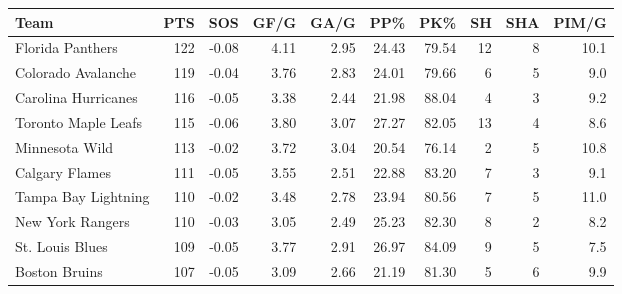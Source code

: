 \documentclass[
  11pt,
]{book}
\newenvironment{Shaded}{\begin{snugshade}}{\end{snugshade}}
\newcommand{\AttributeTok}[1]{\textcolor[rgb]{0.77,0.63,0.00}{#1}}
\newcommand{\CommentTok}[1]{\textcolor[rgb]{0.56,0.35,0.01}{\textit{#1}}}
\newcommand{\DecValTok}[1]{\textcolor[rgb]{0.00,0.00,0.81}{#1}}
\newcommand{\FunctionTok}[1]{\textcolor[rgb]{0.00,0.00,0.00}{#1}}
\newcommand{\NormalTok}[1]{#1}
\newcommand{\OtherTok}[1]{\textcolor[rgb]{0.56,0.35,0.01}{#1}}
\newcommand{\SpecialCharTok}[1]{\textcolor[rgb]{0.00,0.00,0.00}{#1}}
\newcommand{\StringTok}[1]{\textcolor[rgb]{0.31,0.60,0.02}{#1}}
\theoremstyle{definition}
\theoremstyle{definition}
\theoremstyle{definition}
\theoremstyle{definition}
\theoremstyle{remark}
\begin{document}
\begin{Shaded}
\end{Shaded}

\begin{tabular}{lrrrrrrrrr}
\toprule
Team & PTS & SOS & GF/G & GA/G & PP\% & PK\% & SH & SHA & PIM/G\\
\midrule
Florida Panthers & 122 & -0.08 & 4.11 & 2.95 & 24.43 & 79.54 & 12 & 8 & 10.1\\
Colorado Avalanche & 119 & -0.04 & 3.76 & 2.83 & 24.01 & 79.66 & 6 & 5 & 9.0\\
Carolina Hurricanes & 116 & -0.05 & 3.38 & 2.44 & 21.98 & 88.04 & 4 & 3 & 9.2\\
Toronto Maple Leafs & 115 & -0.06 & 3.80 & 3.07 & 27.27 & 82.05 & 13 & 4 & 8.6\\
Minnesota Wild & 113 & -0.02 & 3.72 & 3.04 & 20.54 & 76.14 & 2 & 5 & 10.8\\
\addlinespace
Calgary Flames & 111 & -0.05 & 3.55 & 2.51 & 22.88 & 83.20 & 7 & 3 & 9.1\\
Tampa Bay Lightning & 110 & -0.02 & 3.48 & 2.78 & 23.94 & 80.56 & 7 & 5 & 11.0\\
New York Rangers & 110 & -0.03 & 3.05 & 2.49 & 25.23 & 82.30 & 8 & 2 & 8.2\\
St. Louis Blues & 109 & -0.05 & 3.77 & 2.91 & 26.97 & 84.09 & 9 & 5 & 7.5\\
Boston Bruins & 107 & -0.05 & 3.09 & 2.66 & 21.19 & 81.30 & 5 & 6 & 9.9\\
\bottomrule
\end{tabular}
\end{document}
